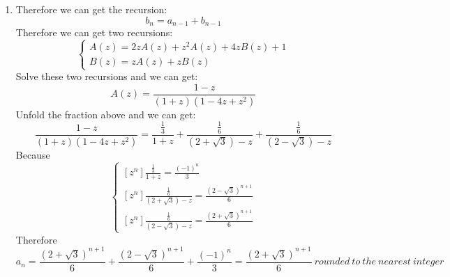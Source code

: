 \documentclass[12pt,a4paper]{article}
\makeatletter
\newtheorem*{solution}{Solution}
\theoremstyle{definition}
\renewenvironment{solution}[1][Solution] {\par\pushQED{\qed}\normalfont\topsep6\p@\@plus6\p@\relax\trivlist\item[\hskip\labelsep\bfseries#1\@addpunct{.}]\ignorespaces}{\popQED\endtrivlist\@endpefalse} \makeatother
\makeatother
\begin{document}
\begin{enumerate}
\begin{solution}
            Therefore we can get the recursion:
            \begin{equation*}
                b_n=a_{n-1}+b_{n-1}
            \end{equation*}
            Therefore we can get two recursions:
            \begin{equation*}
                \begin{cases}
                    A(z)=2zA(z)+z^2A(z)+4zB(z)+1\\
                    B(z)=zA(z)+zB(z)
                \end{cases}
            \end{equation*}
            Solve these two recursions and we can get:
            \begin{equation*}
                A(z)=\frac{1-z}{(1+z)(1-4z+z^2)}
            \end{equation*}
            Unfold the fraction above and we can get:
            \begin{equation*}
                \frac{1-z}{(1+z)(1-4z+z^2)}=\frac{\frac{1}{3}}{1+z}+\frac{\frac{1}{6}}{(2+\sqrt{3})-z}+\frac{\frac{1}{6}}{(2-\sqrt{3})-z}
            \end{equation*}
            Because
            \begin{equation*}
                \begin{cases}
                    [z^n]\frac{\frac{1}{3}}{1+z}=\frac{(-1)^n}{3}\\
                    [z^n]\frac{\frac{1}{6}}{(2+\sqrt{3})-z}=\frac{(2-\sqrt{3})^{n+1}}{6}\\
                    [z^n]\frac{\frac{1}{6}}{(2-\sqrt{3})-z}=\frac{(2+\sqrt{3})^{n+1}}{6}
                \end{cases}
            \end{equation*}
            Therefore
            \begin{equation*}
                a_n=\frac{(2+\sqrt{3})^{n+1}}{6}+\frac{(2-\sqrt{3})^{n+1}}{6}+\frac{(-1)^n}{3}=\frac{(2+\sqrt{3})^{n+1}}{6}\ rounded\ to\ the\ nearest\ integer
            \end{equation*}
        \end{solution}
\end{enumerate}

\end{document}
